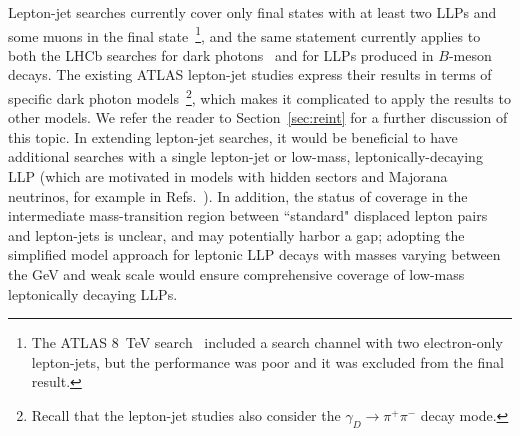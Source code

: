 Lepton-jet searches currently cover only final states with at least two LLPs and some muons in the final state~\footnote{The ATLAS 8~TeV search~\cite{Aad:2014yea} included a search channel with two electron-only lepton-jets, but the performance was poor and it was excluded from the final result.}, and the same statement currently applies to both the LHCb searches for dark photons~\cite{Aaij:2016rxn,Aaij:2017rft} and for LLPs produced in $B$-meson decays. The existing ATLAS lepton-jet studies express their results in terms of specific dark photon models~\footnote{Recall that the lepton-jet studies also consider the $\gamma_D \to \pi^+ \pi^-$ decay mode.}, which makes it complicated to apply the results to other models. We refer the reader to Section~\ref{sec:reint} for a further discussion of this topic. In extending lepton-jet searches, it would be beneficial to have additional searches with a single lepton-jet or low-mass, leptonically-decaying LLP (which are motivated in models with hidden sectors and Majorana neutrinos, for example in Refs.~\cite{Izaguirre:2015pga,Izaguirre:2015zva}). In addition, the status of coverage in the intermediate mass-transition region between ``standard" displaced lepton pairs and lepton-jets is unclear, and may potentially harbor a gap; adopting the simplified model approach for leptonic LLP decays with masses varying between the GeV and weak scale would ensure comprehensive coverage of low-mass leptonically decaying LLPs.

